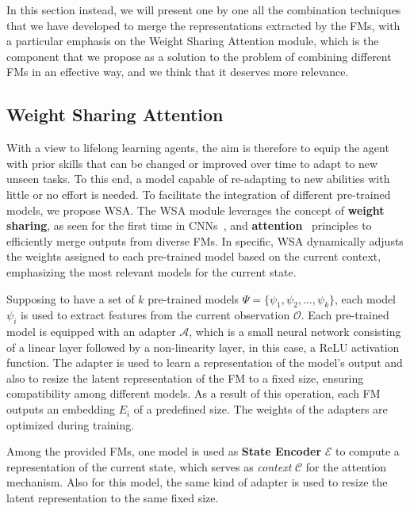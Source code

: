 In this section instead, we will present one by one all the combination techniques that we have developed to merge the representations extracted by the FMs, with a particular emphasis on the Weight Sharing Attention module, which is the component that we propose as a solution to the problem of combining different FMs in an effective way, and we think that it deserves more relevance.


\subsection{Weight Sharing Attention}
\label{sec:wsa}

With a view to lifelong learning agents, the aim is therefore to equip the agent with prior skills that can be changed or improved over time to adapt to new unseen tasks.
To this end, a model capable of re-adapting to new abilities with little or no effort is needed.
To facilitate the integration of different pre-trained models, we propose WSA\@.
The WSA module leverages the concept of \textbf{weight sharing}, as seen for the first time in CNNs~\citep{fukushima1980neocognitron}, and \textbf{attention}~\citep{vaswani2017attention} principles to efficiently merge outputs from diverse FMs.
In specific, WSA dynamically adjusts the weights assigned to each pre-trained model based on the current context, emphasizing the most relevant models for the current state.

Supposing to have a set of $k$ pre-trained models $\Psi = \{\psi_1, \psi_2, \ldots, \psi_k\}$, each model $\psi_i$ is used to extract features from the current observation $\mathcal{O}$.
Each pre-trained model is equipped with an adapter $\mathcal{A}$, which is a small neural network consisting of a linear layer followed by a non-linearity layer, in this case, a ReLU activation function.
The adapter is used to learn a representation of the model's output and also to resize the latent representation of the FM to a fixed size, ensuring compatibility among different models.
As a result of this operation, each FM outputs an embedding $E_i$ of a predefined size.
The weights of the adapters are optimized during training.

Among the provided FMs, one model is used as \textbf{State Encoder} $\mathcal{E}$ to compute a representation of the current state, which serves as \textit{context} $\mathcal{C}$ for the attention mechanism.
Also for this model, the same kind of adapter is used to resize the latent representation to the same fixed size.


